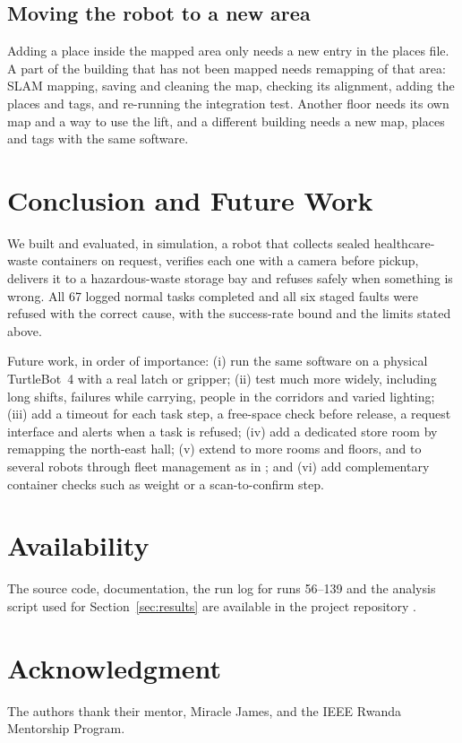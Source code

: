 \documentclass[conference]{IEEEtran}
\begin{document}
\subsection{Moving the robot to a new area}
Adding a place inside the mapped area only needs a new entry in the places file. A part of the building that has not been mapped needs remapping of that area: SLAM mapping, saving and cleaning the map, checking its alignment, adding the places and tags, and re-running the integration test. Another floor needs its own map and a way to use the lift, and a different building needs a new map, places and tags with the same software.

\section{Conclusion and Future Work}\label{sec:conclusion}
We built and evaluated, in simulation, a robot that collects sealed healthcare-waste containers on request, verifies each one with a camera before pickup, delivers it to a hazardous-waste storage bay and refuses safely when something is wrong. All 67 logged normal tasks completed and all six staged faults were refused with the correct cause, with the success-rate bound and the limits stated above.

Future work, in order of importance: (i) run the same software on a physical TurtleBot~4 with a real latch or gripper; (ii) test much more widely, including long shifts, failures while carrying, people in the corridors and varied lighting; (iii) add a timeout for each task step, a free-space check before release, a request interface and alerts when a task is refused; (iv) add a dedicated store room by remapping the north-east hall; (v) extend to more rooms and floors, and to several robots through fleet management as in \cite{valner2022rmf}; and (vi) add complementary container checks such as weight or a scan-to-confirm step.

\section*{Availability}
The source code, documentation, the run log for runs 56--139 and the analysis script used for Section~\ref{sec:results} are available in the project repository \cite{hcwrepo}.

\section*{Acknowledgment}
The authors thank their mentor, Miracle James, and the IEEE Rwanda Mentorship Program.



\end{document}
